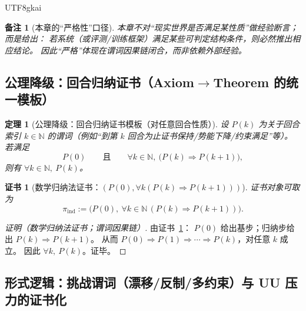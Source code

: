 \documentclass[12pt]{article}
\newtheorem{theorem}{定理}[section]
\newtheorem{remark}{备注}[section]
\newtheorem{Certificate}{证书}[section]
\newcommand{\NN}{\mathbb{N}}
\begin{document}
\begin{CJK*}{UTF8}{gkai}
\begin{remark}[本章的“严格性”口径]
本章不对“现实世界是否满足某性质”做经验断言；而是给出：
若系统（或评测/训练框架）满足某些可判定结构条件，则必然推出相应结论。
因此“严格”体现在谓词因果链闭合，而非依赖外部经验。
\end{remark}

\subsection{公理降级：回合归纳证书（Axiom$\to$Theorem 的统一模板）}
\label{sec:challenge-round-induction}

\begin{theorem}[公理降级：回合归纳证书模板（对任意回合性质）]
\label{thm:challenge-round-induction-schema}
设 $P(k)$ 为关于回合索引 $k\in\NN$ 的谓词（例如“到第 $k$ 回合为止证书保持/势能下降/约束满足”等）。
若满足
\[
  P(0)\qquad\text{且}\qquad \forall k\in\NN,\ \bigl(P(k)\Rightarrow P(k+1)\bigr),
\]
则有 $\forall k\in\NN,\ P(k)$。
\end{theorem}

\begin{Certificate}[数学归纳法证书：$(P(0),\forall k(P(k)\Rightarrow P(k+1)))$]
\label{cert:challenge-round-induction-schema}
证书对象可取为
\[
  \pi_{\mathrm{ind}}
  :=\bigl(P(0),\ \forall k\in\NN\,(P(k)\Rightarrow P(k+1))\bigr).
\]
\end{Certificate}

\begin{proof}[证明（数学归纳法证书；谓词因果链）]
由证书~\ref{cert:challenge-round-induction-schema}：
$P(0)$ 给出基步；归纳步给出 $P(k)\Rightarrow P(k+1)$。
从而 $P(0)\Rightarrow P(1)\Rightarrow\cdots\Rightarrow P(k)$，对任意 $k$ 成立。
因此 $\forall k,\ P(k)$。证毕。
\end{proof}

\subsection{形式逻辑：挑战谓词（漂移/反制/多约束）与 UU 压力的证书化}
\label{sec:challenge-predicates}


\end{CJK*}
\end{document}
